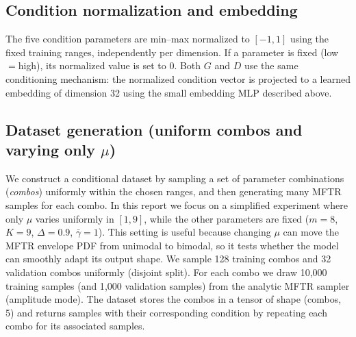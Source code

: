 \subsection{Condition normalization and embedding}
The five condition parameters are min--max normalized to $[-1,1]$ using the fixed training ranges, independently per dimension. If a parameter is fixed (low$=$high), its normalized value is set to 0.
Both $G$ and $D$ use the same conditioning mechanism: the normalized condition vector is projected to a learned embedding of dimension 32 using the small embedding MLP described above.

\subsection{Dataset generation (uniform combos and varying only \texorpdfstring{$\mu$}{mu})}
We construct a conditional dataset by sampling a set of parameter combinations (\emph{combos}) uniformly within the chosen ranges, and then generating many MFTR samples for each combo.
In this report we focus on a simplified experiment where only $\mu$ varies uniformly in $[1,9]$, while the other parameters are fixed ($m=8$, $K=9$, $\Delta=0.9$, $\bar{\gamma}=1$). This setting is useful because changing $\mu$ can move the MFTR envelope PDF from unimodal to bimodal, so it tests whether the model can smoothly adapt its output shape.
We sample 128 training combos and 32 validation combos uniformly (disjoint split). For each combo we draw 10{,}000 training samples (and 1{,}000 validation samples) from the analytic MFTR sampler (amplitude mode). The dataset stores the combos in a tensor of shape (combos, 5) and returns samples with their corresponding condition by repeating each combo for its associated samples.
